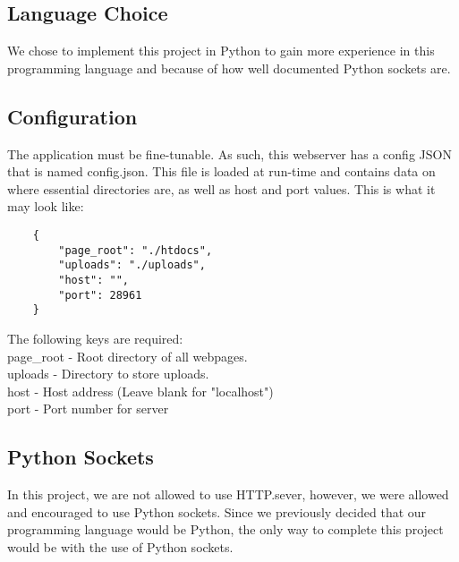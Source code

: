 

    \subsection{Language Choice}
    We chose to implement this project in Python to gain more experience in this programming language and because of how well documented Python sockets are. 
    \subsection{Configuration}
    The application must be fine-tunable. As such, this webserver has a config JSON that is named config.json. This file is loaded at run-time and contains data on where essential directories are, as well as host and port values. This is what it may look like:
    \begin{verbatim}
    {
        "page_root": "./htdocs",
        "uploads": "./uploads",
        "host": "",
        "port": 28961
    } \end{verbatim}
    The following keys are required: \\
page\_root - Root directory of all webpages. \\
    uploads - Directory to store uploads.\\
    host - Host address (Leave blank for "localhost")\\
    port - Port number for server
    \subsection{Python Sockets}
    In this project, we are not allowed to use HTTP.sever, however, we were allowed and encouraged to use Python sockets. Since we previously decided that our programming language would be Python, the only way to complete this project would be with the use of Python sockets.

